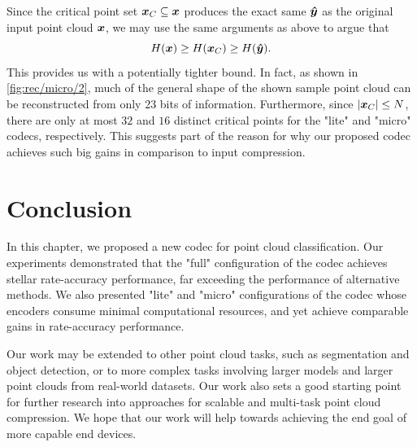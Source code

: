 Since the critical point set ${\boldsymbol{x}}_C \subseteq {\boldsymbol{x}}$ produces the exact same ${\boldsymbol{\hat{y}}}$ as the original input point cloud ${\boldsymbol{x}}$, we may use the same arguments as above to argue that
\[ H({\boldsymbol{x}}) \geq H({\boldsymbol{x}}_C) \geq H({\boldsymbol{\hat{y}}}). \]
This provides us with a potentially tighter bound.
In fact, as shown in \cref{fig:rec/micro/2}, much of the general shape of the shown sample point cloud can be reconstructed from only 23 bits of information.
Furthermore, since $|{\boldsymbol{x}}_C| \leq N$, there are only at most $32$ and $16$ distinct critical points for the "lite" and "micro" codecs, respectively.
This suggests part of the reason for why our proposed codec achieves such big gains in comparison to input compression.




\section{Conclusion}
\label{sec:conclusion}

In this chapter, we proposed a new codec for point cloud classification.
Our experiments demonstrated that the "full" configuration of the codec achieves stellar rate-accuracy performance, far exceeding the performance of alternative methods.
We also presented "lite" and "micro" configurations of the codec whose encoders consume minimal computational resources, and yet achieve comparable gains in rate-accuracy performance.

Our work may be extended to other point cloud tasks, such as segmentation and object detection, or to more complex tasks involving larger models and larger point clouds from real-world datasets.
Our work also sets a good starting point for further research into approaches for scalable and multi-task point cloud compression.
We hope that our work will help towards achieving the end goal of more capable end devices.




%
% 
% 
%
%
%


\endgroup
